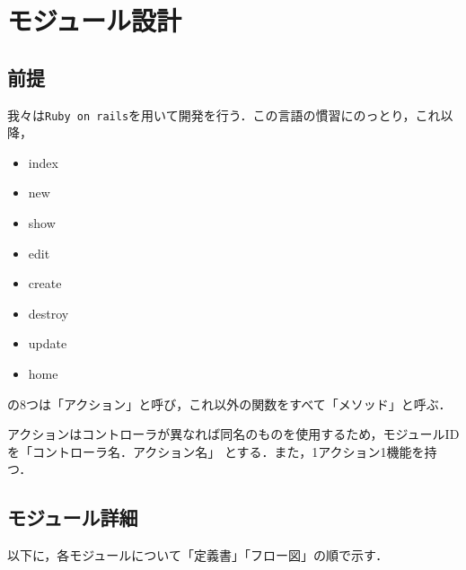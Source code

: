 \chapter{モジュール設計}
\section{前提}
我々は\texttt{Ruby on rails}を用いて開発を行う．この言語の慣習にのっとり，これ以降，
\begin{itemize}
    \item index
    \item new
    \item show
    \item edit
    \item create
    \item destroy
    \item update
    \item home
\end{itemize}
の8つは「アクション」と呼び，これ以外の関数をすべて「メソッド」と呼ぶ．\par
アクションはコントローラが異なれば同名のものを使用するため，モジュールIDを「コントローラ名．アクション名」
とする．また，1アクション1機能を持つ．

\section{モジュール詳細}
以下に，各モジュールについて「定義書」「フロー図」の順で示す．

\clearpage

